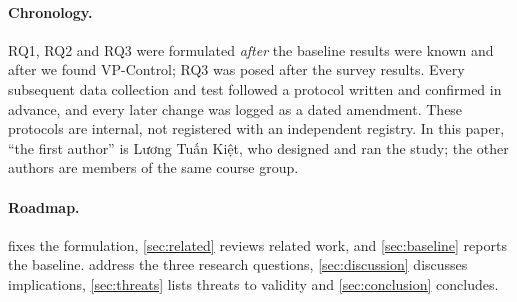 \paragraph{Chronology.} RQ1, RQ2 and RQ3 were formulated \emph{after} the baseline results were known and after we found VP-Control; RQ3 was posed after the survey results. Every subsequent data collection and test followed a protocol written and confirmed in advance, and every later change was logged as a dated amendment. These protocols are internal, not registered with an independent registry. In this paper, ``the first author'' is Lương Tuấn Kiệt, who designed and ran the study; the other authors are members of the same course group.

\paragraph{Roadmap.}  fixes the formulation, \cref{sec:related} reviews related work, and \cref{sec:baseline} reports the baseline.  address the three research questions, \cref{sec:discussion} discusses implications, \cref{sec:threats} lists threats to validity and \cref{sec:conclusion} concludes.
